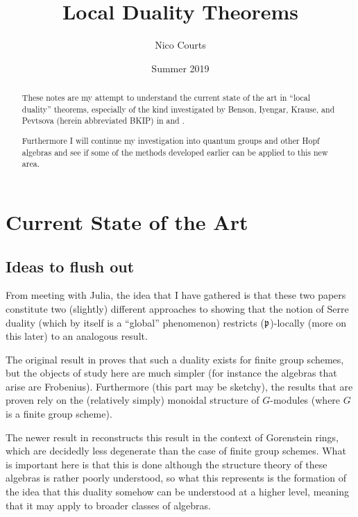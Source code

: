 \documentclass[12pt]{article}
\begin{document}
\title{Local Duality Theorems \vspace{-1ex}}
\author{Nico Courts}
\date{Summer 2019}
\maketitle

\renewcommand{\abstractname}{Introduction}
\begin{abstract}
	These notes are my attempt to understand the current state of the art in ``local duality'' theorems, especially 
	of the kind investigated by Benson, Iyengar, Krause, and Pevtsova (herein abbreviated BKIP) in \cite{BIKPgroupschemes} and \cite{BKIPgorenstein}.

	Furthermore I will continue my investigation into quantum groups and other Hopf algebras and see if some of the methods developed earlier 
	can be applied to this new area.
\end{abstract}

\section{Current State of the Art}
\subsection{Ideas to flush out}
From meeting with Julia, the idea that I have gathered is that these two papers constitute two (slightly) different approaches 
to showing that the notion of Serre duality (which by itself is a ``global'' phenomenon) restricts ($\mathfrak{p}$)-locally (more on this later)
to an analogous result.

The original result in \cite{BIKPgroupschemes} proves that such a duality exists for finite group schemes, but the objects of study here are 
much simpler (for instance the algebras that arise are Frobenius). Furthermore (this part may be sketchy), the results that are proven 
rely on the (relatively simply) monoidal structure of $G$-modules (where $G$ is a finite group scheme). 

The newer result in \cite{BKIPgorenstein} reconstructs this result in the context of Gorenstein rings, which are decidedly less degenerate than 
the case of finite group schemes. What is important here is that this is done although the structure theory of these algebras 
is rather poorly understood, so what this represents is the formation of the idea that this duality somehow can be understood at
a higher level, meaning that it may apply to broader classes of algebras.
\end{document}
